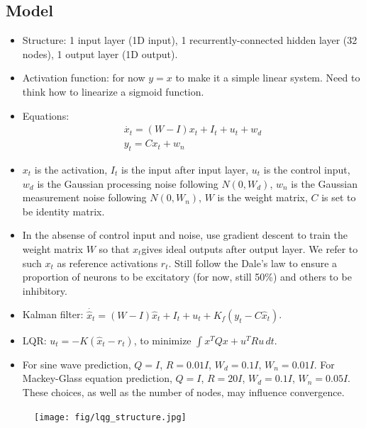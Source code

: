 \documentclass[12pt, a4paper]{article}
\begin{document}
\subsection*{Model}
\begin{itemize}
    \item Structure: 1 input layer (1D input), 1 recurrently-connected hidden layer (32 nodes), 1 output layer (1D output). 

    \item Activation function: for now $y=x$ to make it a simple linear system. Need to think how to linearize a sigmoid function. 
    
    \item Equations: 
    \begin{eqnarray}
    \nonumber
    \dot{x_t} = (W-I)x_t + I_{t} + u_{t} + w_d \\
    \nonumber
    y_t = Cx_{t} + w_n
    \end{eqnarray}
    
    \item $x_t$ is the activation, $I_t$ is the input after input layer, $u_t$ is the control input, $w_d$ is the Gaussian processing noise following $N(0,W_d)$, $w_n$ is the Gaussian measurement noise following $N(0,W_n)$, $W$ is the weight matrix, $C$ is set to be identity matrix.

    \item In the absense of control input and noise, use gradient descent to train the weight matrix $W$ so that $x_t$gives ideal outputs after output layer. We refer to such $x_t$ as reference activations $r_t$. Still follow the Dale's law to ensure a proportion of neurons to be excitatory (for now, still 50\%) and others to be inhibitory. 

    \item Kalman filter: $\dot{\hat{x}_t} = (W-I)\hat{x}_t + I_{t} + u_{t} + K_f(y_t - C\hat{x}_t)$.
    
    \item LQR: $u_t = -K(\hat{x}_t - r_t)$, to minimize $\int x^TQx + u^TRu \,dt$.

    \item For sine wave prediction, $Q = I$, $R = 0.01I$, $W_d = 0.1I$, $W_n = 0.01I$. For Mackey-Glass equation prediction, $Q = I$, $R = 20I$, $W_d = 0.1I$, $W_n = 0.05I$. These choices, as well as the number of nodes, may influence convergence.

\end{itemize}

\begin{figure}[H]
    \centering
    \texttt{[image: fig/lqg\_structure.jpg]}
\end{figure}
\end{document}
